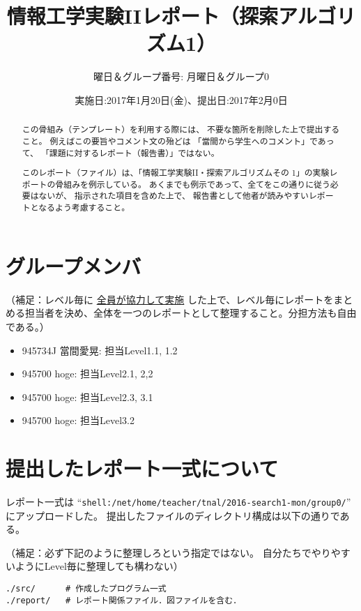\documentclass[uplatex,10pt]{jsarticle}
\begin{document}
\title{情報工学実験IIレポート（探索アルゴリズム1）}
\author{曜日＆グループ番号: 月曜日＆グループ0} %
\date{実施日:2017年1月20日(金)、提出日:2017年2月0日}

\maketitle

\begin{abstract}
この骨組み（テンプレート）を利用する際には、
不要な箇所を削除した上で提出すること。
例えばこの要旨やコメント文の殆どは
「當間から学生へのコメント」であって、
「課題に対するレポート（報告書）」ではない。

このレポート（ファイル）は、「情報工学実験II・探索アルゴリズムその
1\cite{info2-search1}」の実験レポートの骨組みを例示している。
あくまでも例示であって、全てをこの通りに従う必要はないが、
指示された項目を含めた上で、
報告書として他者が読みやすいレポートとなるよう考慮すること。
\end{abstract}

\section*{グループメンバ}
（補足：レベル毎に \underline{全員が協力して実施} した上で、レベル毎にレポートをまとめる担当者を決め、全体を一つのレポートとして整理すること。分担方法も自由である。）
\begin{itemize}
 \item 945734J 當間愛晃: 担当Level1.1, 1.2
 \item 945700 hoge: 担当Level2.1, 2,2
 \item 945700 hoge: 担当Level2.3, 3.1
 \item 945700 hoge: 担当Level3.2
\end{itemize}

\section*{提出したレポート一式について}
レポート一式は
``\verb|shell:/net/home/teacher/tnal/2016-search1-mon/group0/|''
にアップロードした。
提出したファイルのディレクトリ構成は以下の通りである。

\vspace{+0.5cm}
（補足：必ず下記のように整理しろという指定ではない。
自分たちでやりやすいようにLevel毎に整理しても構わない）
\begin{breakbox}
\begin{verbatim}
./src/      # 作成したプログラム一式
./report/   # レポート関係ファイル．図ファイルを含む．
\end{verbatim}
\end{breakbox}
\end{document}
